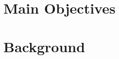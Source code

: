 \documentclass[a0,portrait]{a0poster}
\begin{document}
\begin{multicols}{2}

\color{DarkSlateGray} %

\section*{Main Objectives}



\section*{Background}



\end{multicols}
\end{document}
